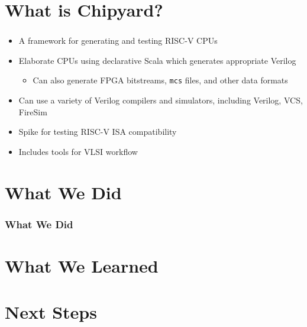 \documentclass{eceday}
\begin{document}
\section{What is Chipyard?}\label{sec:What_is_Chipyard}
\begin{frame}
  \frametitle{}
  \begin{itemize}
  \item A framework for generating and testing RISC-V CPUs
  \item Elaborate CPUs using declarative Scala which generates appropriate Verilog
    \begin{itemize}
    \item Can also generate FPGA bitstreams, \texttt{mcs} files, and other data formats
    \end{itemize}
  \item Can use a variety of Verilog compilers and simulators, including Verilog, VCS, FireSim
  \item Spike for testing RISC-V ISA compatibility
  \item Includes tools for VLSI workflow
  \end{itemize}
\end{frame}

\section{What We Did}\label{sec:What_We_Did}
\begin{frame}
  \frametitle{What We Did}
\end{frame}

\section{What We Learned}\label{sec:What_We_Learned}
\begin{frame}
  \frametitle{}
  
\end{frame}

\section{Next Steps}\label{sec:Next_Steps}
\end{document}

